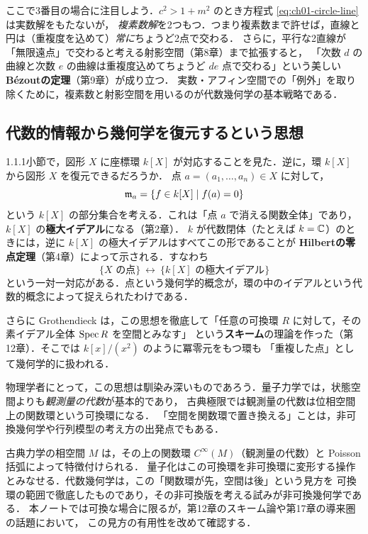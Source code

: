 ここで3番目の場合に注目しよう．$c^2>1+m^2$ のとき方程式 \eqref{eq:ch01-circle-line} は実数解をもたないが，
\emph{複素数解}を2つもつ．つまり複素数まで許せば，直線と円は（重複度を込めて）\emph{常に}ちょうど2点で交わる．
さらに，平行な2直線が「無限遠点」で交わると考える射影空間（第8章）まで拡張すると，
「次数 $d$ の曲線と次数 $e$ の曲線は重複度込めてちょうど $de$ 点で交わる」という美しい
\textbf{Bézoutの定理}（第9章）が成り立つ．
実数・アフィン空間での「例外」を取り除くために，複素数と射影空間を用いるのが代数幾何学の基本戦略である．

\subsection{代数的情報から幾何学を復元するという思想}

1.1.1小節で，図形 $X$ に座標環 $k[X]$ が対応することを見た．逆に，環 $k[X]$ から図形 $X$ を復元できるだろうか．
点 $a=(a_1,\dots,a_n)\in X$ に対して，
\[
  \mathfrak{m}_a=\{f\in k[X]\mid f(a)=0\}
\]
という $k[X]$ の部分集合を考える．これは「点 $a$ で消える関数全体」であり，$k[X]$ の\textbf{極大イデアル}になる（第2章）．
$k$ が代数閉体（たとえば $k=\mathbb{C}$）のときには，逆に $k[X]$ の極大イデアルはすべてこの形であることが
\textbf{Hilbertの零点定理}（第4章）によって示される．すなわち
\[
  \{X\text{ の点}\}\ \longleftrightarrow\ \{k[X]\text{ の極大イデアル}\}
\]
という一対一対応がある．点という幾何学的概念が，環の中のイデアルという代数的概念によって捉えられたわけである．

さらに Grothendieck は，この思想を徹底して「任意の可換環 $R$ に対して，その素イデアル全体 $\operatorname{Spec} R$ を空間とみなす」
という\textbf{スキーム}の理論を作った（第12章）．そこでは $k[x]/(x^2)$ のように冪零元をもつ環も
「重複した点」として幾何学的に扱われる．

物理学者にとって，この思想は馴染み深いものであろう．量子力学では，状態空間よりも\emph{観測量の代数}が基本的であり，
古典極限では観測量の代数は位相空間上の関数環という可換環になる．
「空間を関数環で置き換える」ことは，非可換幾何学や行列模型の考え方の出発点でもある．

\begin{physbox}[空間と関数環]
古典力学の相空間 $M$ は，その上の関数環 $C^\infty(M)$（観測量の代数）と Poisson 括弧によって特徴付けられる．
量子化はこの可換環を非可換環に変形する操作とみなせる．代数幾何学は，この「関数環が先，空間は後」という見方を
可換環の範囲で徹底したものであり，その非可換版を考える試みが非可換幾何学である．
本ノートでは可換な場合に限るが，第12章のスキーム論や第17章の導来圏の話題において，
この見方の有用性を改めて確認する．
\end{physbox}

